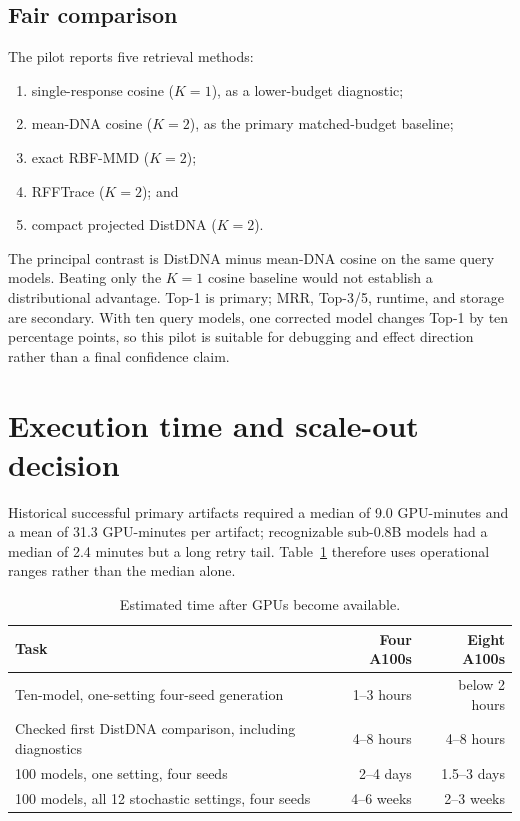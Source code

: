\documentclass[11pt,a4paper]{article}
\begin{document}
\subsection{Fair comparison}

The pilot reports five retrieval methods:

\begin{enumerate}
  \item single-response cosine ($K=1$), as a lower-budget diagnostic;
  \item mean-DNA cosine ($K=2$), as the primary matched-budget baseline;
  \item exact RBF-MMD ($K=2$);
  \item RFFTrace ($K=2$); and
  \item compact projected DistDNA ($K=2$).
\end{enumerate}

The principal contrast is DistDNA minus mean-DNA cosine on the same query
models. Beating only the $K=1$ cosine baseline would not establish a
distributional advantage. Top-1 is primary; MRR, Top-3/5, runtime, and storage
are secondary. With ten query models, one corrected model changes Top-1 by ten
percentage points, so this pilot is suitable for debugging and effect direction
rather than a final confidence claim.

\section{Execution time and scale-out decision}

Historical successful primary artifacts required a median of 9.0 GPU-minutes
and a mean of 31.3 GPU-minutes per artifact; recognizable sub-0.8B models had a
median of 2.4 minutes but a long retry tail. Table~\ref{tab:timing} therefore
uses operational ranges rather than the median alone.

\begin{table}[htbp]
\centering
\caption{Estimated time after GPUs become available.}
\label{tab:timing}
\begin{tabularx}{\textwidth}{Xrr}
\toprule
Task & Four A100s & Eight A100s \\
\midrule
Ten-model, one-setting four-seed generation & 1--3 hours & below 2 hours \\
Checked first DistDNA comparison, including diagnostics & 4--8 hours & 4--8 hours \\
100 models, one setting, four seeds & 2--4 days & 1.5--3 days \\
100 models, all 12 stochastic settings, four seeds & 4--6 weeks & 2--3 weeks \\
\bottomrule
\end{tabularx}
\end{table}
\end{document}
